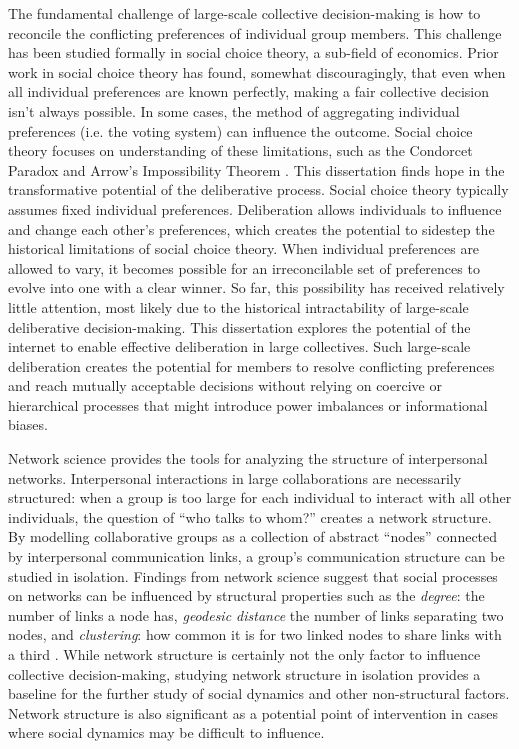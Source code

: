The fundamental challenge of large-scale collective decision-making is how to
reconcile the conflicting preferences of individual group members.
This challenge has been studied formally in social choice theory,
a sub-field of economics.
Prior work in social choice theory has found, somewhat discouragingly,
that even when all individual preferences are known perfectly,
making a fair collective decision isn't always possible.
In some cases, the method of aggregating individual preferences
(i.e. the voting system) can influence the outcome.
Social choice theory focuses on understanding of these limitations,
such as the Condorcet Paradox
\cite{condorcet_essay_1785} and
Arrow's Impossibility Theorem \cite{arrow_social_2012}.
This dissertation finds hope in the transformative potential of the
deliberative process.
Social choice theory typically assumes fixed individual preferences.
Deliberation allows individuals to influence and change each other's
preferences,
which creates the potential to sidestep the historical limitations of
social choice theory.
When individual preferences are allowed to vary, it becomes possible for an
irreconcilable set of preferences to evolve into one with a clear winner.
So far, this possibility has received relatively little attention,
most likely due to the historical intractability of large-scale deliberative
decision-making.
This dissertation explores the potential of the internet to enable effective
deliberation in large collectives.
Such large-scale deliberation creates the potential for members to
resolve conflicting preferences and reach mutually acceptable decisions
without relying on coercive or hierarchical processes that might introduce
power imbalances or informational biases.

Network science provides the tools for analyzing the structure of interpersonal
networks.
Interpersonal interactions in large collaborations are necessarily structured:
when a group is too large for each individual to interact with all other individuals,
the question of ``who talks to whom?'' creates a network structure.
By modelling collaborative groups as a collection of abstract ``nodes''
connected by interpersonal communication links,
a group's communication structure can be studied in isolation.
Findings from network science suggest that social processes on networks can be
influenced by structural properties such as
the {\em degree}: the number of links a node has,
{\em geodesic distance} the number of links separating two nodes,
and {\em clustering}: how common it is for two linked nodes to share links with
a third \cite{boccaletti_complex_2006}.
While network structure is certainly not the only factor to influence collective
decision-making,
studying network structure in isolation provides a baseline for the
further study of social dynamics and other non-structural factors.
Network structure is also significant as a potential point of intervention in
cases where social dynamics may be difficult to influence.

